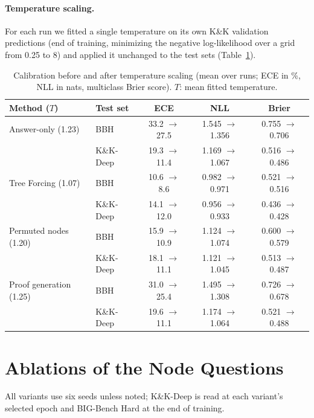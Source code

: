 \documentclass[10pt]{article}
\newcommand{\tf}{Tree Forcing}
\begin{document}
\paragraph{Temperature scaling.} For each run we fitted a single temperature on its own K\&K validation predictions
(end of training, minimizing the negative log-likelihood over a grid from 0.25 to 8) and applied it unchanged to the
test sets (Table~\ref{tab:temp}).

\begin{table}[h]
\centering
\small
\caption{Calibration before and after temperature scaling (mean over runs; ECE in \%, NLL in nats, multiclass Brier
score). $T$: mean fitted temperature.}
\label{tab:temp}
\begin{tabular}{llccc}
\toprule
Method ($T$) & Test set & ECE & NLL & Brier \\
\midrule
Answer-only (1.23) & BBH & 33.2 $\to$ 27.5 & 1.545 $\to$ 1.356 & 0.755 $\to$ 0.706 \\
 & K\&K-Deep & 19.3 $\to$ 11.4 & 1.169 $\to$ 1.067 & 0.516 $\to$ 0.486 \\
\tf{} (1.07) & BBH & 10.6 $\to$ 8.6 & 0.982 $\to$ 0.971 & 0.521 $\to$ 0.516 \\
 & K\&K-Deep & 14.1 $\to$ 12.0 & 0.956 $\to$ 0.933 & 0.436 $\to$ 0.428 \\
Permuted nodes (1.20) & BBH & 15.9 $\to$ 10.9 & 1.124 $\to$ 1.074 & 0.600 $\to$ 0.579 \\
 & K\&K-Deep & 18.1 $\to$ 11.1 & 1.121 $\to$ 1.045 & 0.513 $\to$ 0.487 \\
Proof generation (1.25) & BBH & 31.0 $\to$ 25.4 & 1.495 $\to$ 1.308 & 0.726 $\to$ 0.678 \\
 & K\&K-Deep & 19.6 $\to$ 11.1 & 1.174 $\to$ 1.064 & 0.521 $\to$ 0.488 \\
\bottomrule
\end{tabular}
\end{table}

\section{Ablations of the Node Questions}
\label{app:ablations}
All variants use six seeds unless noted; K\&K-Deep is read at each variant's selected epoch and BIG-Bench Hard at the
end of training.
\end{document}
